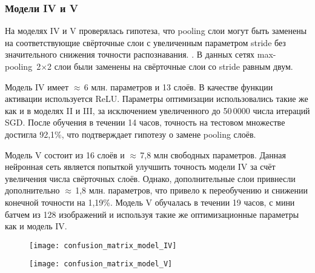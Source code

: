 \subsubsection{Модели IV и V}
На моделях IV и V проверялась гипотеза, что pooling слои могут быть заменены на соответствующие свёрточные слои
с увеличенным параметром stride без значительного снижения точности распознавания. \cite{DBLP:journals/corr/SpringenbergDBR14}.
В данных сетях max-pooling~2$\times$2 слои были заменены  на свёрточные слои со stride равным двум.

Модель IV имеет $\approx$\,6 млн. параметров и 13 слоёв. В качестве функции активации используется ReLU.
Параметры оптимизации использовались такие же как и в моделях II и III, за исключением увеличенного
до 50\,0000 числа итераций SGD. После обучения в течении 14 часов, точность на тестовом множестве достигла 92,1\%, что
подтверждает гипотезу о замене pooling слоёв.

Модель V состоит из 16 слоёв и $\approx$\,7,8 млн свободных параметров. Данная нейронная сеть является попыткой
улучшить точность модели IV за счёт увеличения числа свёрточных слоёв. Однако, дополнительные слои привнесли
дополнительно $\approx$\,1,8 млн. параметров, что привело к переобучению и снижении конечной точности на 1,19\%.
Модель V обучалась в течении 19 часов, с мини батчем из 128 изображений и используя такие же оптимизационные параметры
как и модель IV.

\begin{figure}[H]
\centering
\begin{minipage}{.5\textwidth}
  \centering
  \texttt{[image: confusion\_matrix\_model\_IV]}
  \vspace*{-1.7cm}
\end{minipage}%
\begin{minipage}{.5\textwidth}
  \centering
  \texttt{[image: confusion\_matrix\_model\_V]}
  \vspace*{-1.7cm}
\end{minipage}
\end{figure}

